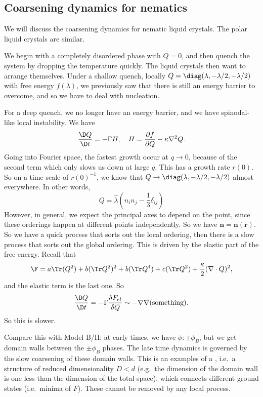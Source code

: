 \documentclass[a4paper]{article}
\begin{document}
\subsection{Coarsening dynamics for nematics}
We will discuss the coarsening dynamics for nematic liquid crystals. The polar liquid crystals are similar.

We begin with a completely disordered phase with $Q = 0$, and then quench the system by dropping the temperature quickly. The liquid crystals then want to arrange themselves. Under a shallow quench, locally $Q = \diag(\lambda, -\lambda/2, -\lambda/2)$ with free energy $f(\lambda)$, we previously saw that there is still an energy barrier to overcome, and so we have to deal with nucleation.

For a deep quench, we no longer have an energy barrier, and we have spinodal-like local instability. We have
\[
  \frac{\D Q}{\D t} = - \Gamma H,\quad H = \frac{\partial f}{\partial Q} - \kappa \nabla^2 Q.
\]
Going into Fourier space, the fastest growth occur at $q \to 0$, because of the second term which only slows us down at large $q$. This has a growth rate $r(0)$. So on a time scale of $r(0)^{-1}$, we know that $Q \to \diag(\lambda, -\lambda/2, -\lambda/2)$ almost everywhere. In other words,
\[
  Q = \hat{\lambda} \left(n_i n_j - \frac{1}{3} \delta_{ij}\right)
\]
However, in general, we expect the principal axes to depend on the point, since these orderings happen at different points independently. So we have $\mathbf{n} = \mathbf{n}(\mathbf{r})$. So we have a quick process that sorts out the local ordering, then there is a slow process that sorts out the global ordering. This is driven by the elastic part of the free energy. Recall that
\[
  \F = a \Tr(Q^2) + b (\Tr Q^2)^2 + b (\Tr Q^4) + c (\Tr Q^2) + \frac{\kappa}{2} (\nabla \cdot Q)^2,
\]
and the elastic term is the last one. So
\[
  \frac{\D Q}{\D t} = - \Gamma \frac{\delta F_{el}}{\delta Q} \sim - \nabla \nabla(\text{something}).
\]
So this is slower.

Compare this with Model B/H: at early times, we have $\phi: \pm \phi_B$, but we get domain walls between the $\pm \phi_B$ phases. The late time dynamics is governed by the slow coarsening of these domain walls. This is an examples of a , i.e.\ a structure of reduced dimensionality $D < d$ (e.g.\ the dimension of the domain wall is one less than the dimension of the total space), which connects different ground states (i.e.\ minima of $F$). These cannot be removed by any local process.
\begin{center}
\end{center}
\end{document}
